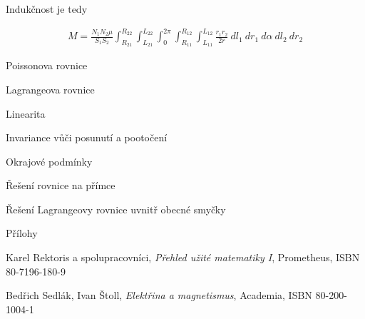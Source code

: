 \documentclass{book}
\begin{document}
Indukčnost je tedy

\begin{equation}
\label{eq:indukcnost_1}
\begin{split}
M = \frac{N_1 N_2 \mu}{S_1 S_2} \int_{R_{21}}^{R_{22}} \int_{L_{21}}^{L_{22}} \int_{0}^{2 \pi} \int_{R_{11}}^{R_{12}} \int_{L_{11}}^{L_{12}} \frac{r_1 r_2}{2 r} \ dl_1 \ dr_1 \ d \alpha \ dl_2 \ dr_2
\end{split}
\end{equation}

Poissonova rovnice

Lagrangeova rovnice

Linearita

Invariance vůči posunutí a pootočení

Okrajové podmínky

Řešení rovnice na přímce

Řešení Lagrangeovy rovnice uvnitř obecné smyčky

Přílohy

\begin{thebibliography}{9}

Karel Rektoris a spolupracovníci,
\textit{Přehled užité matematiky I},
Prometheus,
ISBN 80-7196-180-9

Bedřich Sedlák, Ivan Štoll,
\textit{Elektřina a magnetismus},
Academia,
ISBN 80-200-1004-1

\end{thebibliography}
\end{document}
